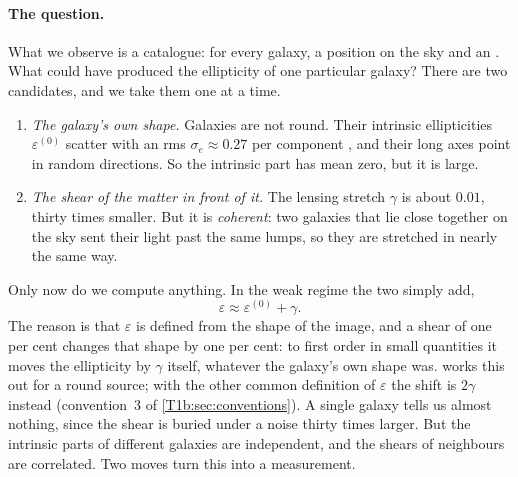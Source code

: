 \paragraph{The question.}
What we observe is a catalogue: for every galaxy, a position on the sky and an  . What could have produced the ellipticity of one particular galaxy? There are two candidates, and we take them one at a time.
\begin{enumerate}[leftmargin=1.6em,itemsep=2pt]
\item \emph{The galaxy's own shape.} Galaxies are not round. Their intrinsic ellipticities $\varepsilon^{(0)}$ scatter with an rms $\sigma_e\approx0.27$ per component \cite{Asgari2021KiDS}, and their long axes point in random directions. So the intrinsic part has mean zero, but it is large.
\item \emph{The shear of the matter in front of it.} The lensing stretch $\gamma$ is about $0.01$, thirty times smaller. But it is \emph{coherent}: two galaxies that lie close together on the sky sent their light past the same lumps, so they are stretched in nearly the same way.
\end{enumerate}
Only now do we compute anything. In the weak regime the two simply add,
\begin{equation}
\varepsilon\approx\varepsilon^{(0)}+\gamma .
\label{T1b:eq:eps-sum}
\end{equation}
The reason is that $\varepsilon$ is defined from the shape of the image, and a shear of one per cent changes that shape by one per cent: to first order in small quantities it moves the ellipticity by $\gamma$ itself, whatever the galaxy's own shape was.  works this out for a round source; with the other common definition of $\varepsilon$ the shift is $2\gamma$ instead (convention~3 of \cref{T1b:sec:conventions}). A single galaxy tells us almost nothing, since the shear is buried under a noise thirty times larger. But the intrinsic parts of different galaxies are independent, and the shears of neighbours are correlated. Two moves turn this into a measurement.

